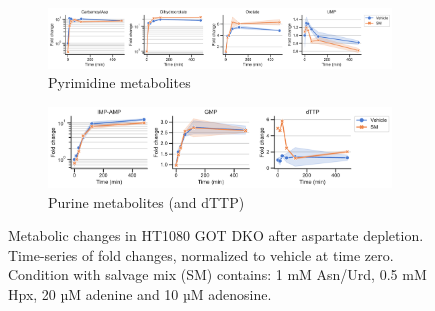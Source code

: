 \begin{figure}[!ht]
\begin{subfigure}[b]{0.9\textwidth}
         \label{fig:sapp:GOT_DKO_Asp_depl:HT1080_DKO_tca}
     \end{subfigure}
     \hfill
     \begin{subfigure}[b]{0.9\textwidth}
         \includegraphics[width=\textwidth]{figures/sapp/GOT_DKO_Asp_depl/HT1080_DKO_pyr.pdf}
         \caption{Pyrimidine metabolites}
         \label{fig:sapp:GOT_DKO_Asp_depl:HT1080_DKO_pyr}
     \end{subfigure}
     \hfill
     \begin{subfigure}[b]{0.68\textwidth}
         \includegraphics[width=\textwidth]{figures/sapp/GOT_DKO_Asp_depl/HT1080_DKO_pur.pdf}
         \caption{Purine metabolites (and dTTP)}
         \label{fig:sapp:GOT_DKO_Asp_depl:HT1080_DKO_pur}
     \end{subfigure}
     \hfill
        \caption[Metabolic changes in HT1080 after Asp depl.]{
        Metabolic changes in HT1080 GOT DKO after aspartate depletion.
        Time-series of fold changes, normalized to vehicle at time zero.
        Condition with salvage mix (SM) contains: 1 mM Asn/Urd, 0.5 mM Hpx, 20 µM adenine and 10 µM adenosine.
        }
        \label{fig:sapp:GOT_DKO_Asp_depl:HT1080_DKO_metab}
\end{figure}





\FloatBarrier
